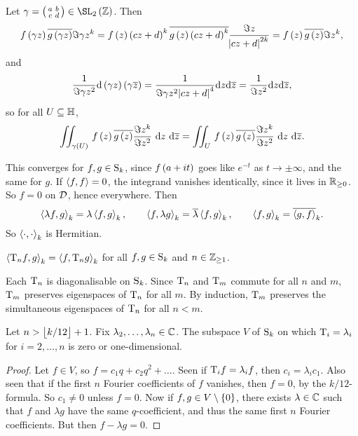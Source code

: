 \pagebreak

Let $ \gamma = \twobytwosmall{a}{b}{c}{d} \in \SL_2\br{\ZZ} $. Then
$$ f\br{\gamma z}\overline{g\br{\gamma z}}\Im \gamma z^k = f\br{z}\br{cz + d}^k\overline{g\br{z}\br{cz + d}^k}\dfrac{\Im z}{\abs{cz + d}^{2k}} = f\br{z}\overline{g\br{z}}\Im z^k, $$
and
$$ \dfrac{1}{\Im \gamma z^2}\d\br{\gamma z}\br{\gamma \overline{z}} = \dfrac{1}{\Im \gamma z^2\abs{cz + d}^4}\d z\d\overline{z} = \dfrac{1}{\Im z^2}\d z\d\overline{z}, $$
so for all $ U \subseteq \HH $,
$$ \iintd{\gamma\br{U}}{f\br{z}\overline{g\br{z}}\dfrac{\Im z^k}{\Im z^2}}{z}{\overline{z}} = \iintd{U}{f\br{z}\overline{g\br{z}}\dfrac{\Im z^k}{\Im z^2}}{z}{\overline{z}}. $$

\begin{note*}
This converges for $ f, g \in \S_k $, since $ f\br{a + it} $ goes like $ e^{-t} $ as $ t \to \pm\infty $, and the same for $ g $. If $ \abr{f, f} = 0 $, the integrand vanishes identically, since it lives in $ \RR_{\ge 0} $. So $ f = 0 $ on $ \DDD $, hence everywhere. Then
$$ \abr{\lambda f, g}_k = \lambda\abr{f, g}_k, \qquad \abr{f, \lambda g}_k = \overline{\lambda}\abr{f, g}_k, \qquad \abr{f, g}_k = \overline{\abr{g, f}}_k. $$
So $ \abr{\cdot, \cdot}_k $ is Hermitian.
\end{note*}

\begin{theorem}
\label{thm:innerproduct}
$ \abr{\T_nf, g}_k = \abr{f, \T_ng}_k $ for all $ f, g \in \S_k $ and $ n \in \ZZ_{\ge 1} $.
\end{theorem}

\begin{corollary}
Each $ \T_n $ is diagonalisable on $ \S_k $. Since $ \T_n $ and $ \T_m $ commute for all $ n $ and $ m $, $ \T_m $ preserves eigenspaces of $ \T_n $ for all $ m $. By induction, $ \T_m $ preserves the simultaneous eigenspaces of $ \T_n $ for all $ n < m $.
\end{corollary}

\begin{proposition}
Let $ n > \fbr{k / 12} + 1 $. Fix $ \lambda_2, \dots, \lambda_n \in \CC $. The subspace $ V $ of $ \S_k $ on which $ \T_i = \lambda_i $ for $ i = 2, \dots, n $ is zero or one-dimensional.
\end{proposition}

\begin{proof}
Let $ f \in V $, so $ f = c_1q + c_2q^2 + \dots $. Seen if $ \T_if = \lambda_if $, then $ c_i = \lambda_ic_1 $. Also seen that if the first $ n $ Fourier coefficients of $ f $ vanishes, then $ f = 0 $, by the $ k / 12 $-formula. So $ c_1 \ne 0 $ unless $ f = 0 $. Now if $ f, g \in V \setminus \cbr{0} $, there exists $ \lambda \in \CC $ such that $ f $ and $ \lambda g $ have the same $ q $-coefficient, and thus the same first $ n $ Fourier coefficients. But then $ f - \lambda g = 0 $.
\end{proof}

